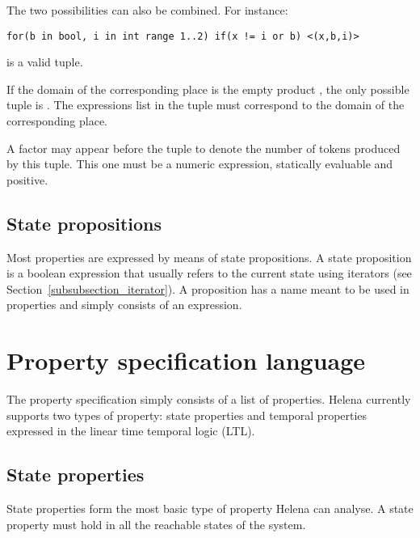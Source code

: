 The two possibilities can also be combined.  For instance:
\begin{lstlisting}
for(b in bool, i in int range 1..2) if(x != i or b) <(x,b,i)>
\end{lstlisting}
is a valid tuple.

If the domain of the corresponding place is the empty product
, the only possible tuple is .  The
expressions list in the tuple must correspond to the domain of the
corresponding place.

A factor may appear before the tuple to denote the number of tokens
produced by this tuple.  This one must be a numeric expression,
statically evaluable and positive.\\

\tupledef

\subsection{State propositions}
Most properties are expressed by means of state propositions.  A state
proposition is a boolean expression that usually refers to the current
state using iterators (see Section~\ref{subsubsection_iterator}).  A
proposition has a name meant to be used in properties and
simply consists of an expression.\\

\statepropositiondef


\section{Property specification language}

The property specification simply consists of a list of properties.
Helena currently supports two types of property: state properties and
temporal properties expressed in the linear time temporal logic (LTL).\\

\propertyspecificationdef

\subsection{State properties}
State properties form the most basic type of property Helena can
analyse.  A state property must hold in all the reachable states of
the system.

